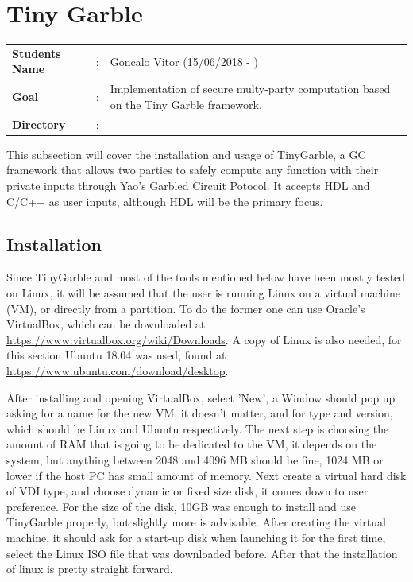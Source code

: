 \clearpage
\section{Tiny Garble}

\begin{refsection}

\begin{tcolorbox}	
\begin{tabular}{p{2.75cm} p{0.2cm} p{10.5cm}} 	
\textbf{Students Name}      &:& Goncalo Vitor (15/06/2018 - )\\
\textbf{Goal}               &:& Implementation of secure multy-party computation based on the Tiny Garble framework.\\
\textbf{Directory}          &:& \\
\end{tabular}
\end{tcolorbox}

This subsection will cover the installation and usage of TinyGarble, a GC framework that allows two parties to safely compute any function with their private inputs through Yao's Garbled Circuit Potocol. It accepts HDL and C/C++ as user inputs, although HDL will be the primary focus.

\subsection{Installation}

Since TinyGarble and most of the tools mentioned below have been mostly tested on Linux, it will be assumed that the user is running Linux on a virtual machine (VM), or directly from a partition. To do the former one can use Oracle's VirtualBox, which can be downloaded at \url{https://www.virtualbox.org/wiki/Downloads}. A copy of Linux is also needed, for this section Ubuntu 18.04 was used, found at \url{https://www.ubuntu.com/download/desktop}.

After installing and opening VirtualBox, select 'New', a Window should pop up asking for a name for the new VM, it doesn't matter, and for type and version, which should be Linux and Ubuntu respectively. The next step is choosing the amount of RAM that is going to be dedicated to the VM,  it depends on the system, but anything between 2048 and 4096 MB should be fine, 1024 MB or lower if the host PC has small amount of memory. Next create a virtual hard disk of VDI type, and choose dynamic or fixed size disk, it comes down to user preference. For the size of the disk, 10GB was enough to install and use TinyGarble properly, but slightly more is advisable.
After creating the virtual machine, it should ask for a start-up disk when launching it for the first time, select the Linux ISO file that was downloaded before. After that the installation of linux is pretty straight forward.


\end{refsection}
